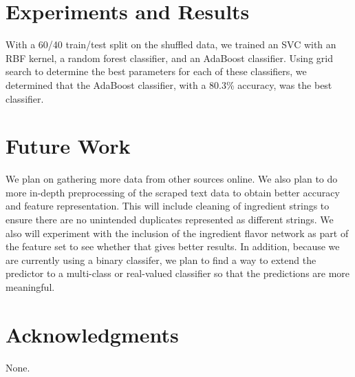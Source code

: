 \documentclass{article}
\begin{document}
\section{Experiments and Results}
With a 60/40 train/test split on the shuffled data, we trained an SVC with an RBF kernel, a random forest classifier, and an AdaBoost classifier. Using grid search to determine the best parameters for each of these classifiers, we determined that the AdaBoost classifier, with a 80.3\% accuracy, was the best classifier.

\section{Future Work}
We plan on gathering more data from other sources online. We also plan to do more in-depth preprocessing of the scraped text data to obtain better accuracy and feature representation. This will include cleaning of ingredient strings to ensure there are no unintended duplicates represented as different strings. We also will experiment with the inclusion of the ingredient flavor network as part of the feature set to see whether that gives better results. In addition, because we are currently using a binary classifer, we plan to find a way to extend the predictor to a multi-class or real-valued classifier so that the predictions are more meaningful.

\section*{Acknowledgments} 
None.



\end{document}
